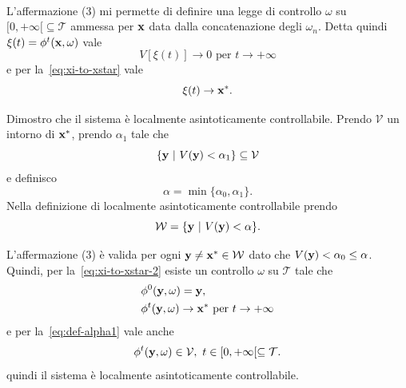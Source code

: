 \begin{steps}
    \hfill\openbox\paragraph{}

    L'affermazione (3) mi permette di definire una legge di controllo
    $\omega$ su $[0, +\infty[ \subseteq \mathcal T$ ammessa per $\mathbf{x}$
    data dalla concatenazione degli $\omega_n$.
    Detta quindi $\xi(t) = \phi^t(\mathbf{x}, \omega)$ vale
    \begin{equation*}
        V[\xi(t)] \to 0 \text{ per } t \to +\infty
    \end{equation*}
    e per la~\eqref{eq:xi-to-xstar} vale
    \begin{equation}
        \xi(t) \to \mathbf{x}^*.
        \label{eq:xi-to-xstar-2}
    \end{equation}

    \item Dimostro che il sistema è localmente asintoticamente
    controllabile.
    Prendo $\mathcal V$ un intorno di $\mathbf{x}^*$, prendo $\alpha_1$ tale che
    \begin{equation}
     \{\mathbf{y}\ |\ V(\mathbf{y}) < \alpha_1 \} \subseteq \mathcal V
        \label{eq:def-alpha1}
    \end{equation}
    e definisco
    \begin{equation*}
        \alpha = \min\{\alpha_0, \alpha_1\}.
    \end{equation*}
    Nella definizione di localmente asintoticamente controllabile prendo
    \begin{equation*}
            \mathcal W = \{\mathbf{y}\ |\ V(\mathbf{y}) < \alpha\}.
    \end{equation*}

    L'affermazione (3) è valida per ogni $\mathbf{y} \neq \mathbf{x}^* \in \mathcal W$
    dato che $V(\mathbf{y}) < \alpha_0 \leq \alpha$.
    Quindi, per la~\eqref{eq:xi-to-xstar-2} esiste un controllo $\omega$
    su $\mathcal T$ tale che
    \begin{align*}
        &\phi^0(\mathbf{y}, \omega) = \mathbf{y}, \\
        &\phi^t(\mathbf{y}, \omega) \to \mathbf{x}^* \text{ per } t \to +\infty
    \end{align*}
    e per la~\eqref{eq:def-alpha1} vale anche
    \begin{equation*}
        \phi^t(\mathbf{y}, \omega) \in \mathcal V, \ t \in [0, +\infty[ \subseteq \mathcal T.
    \end{equation*}
    quindi il sistema è localmente asintoticamente controllabile.


\end{steps}
